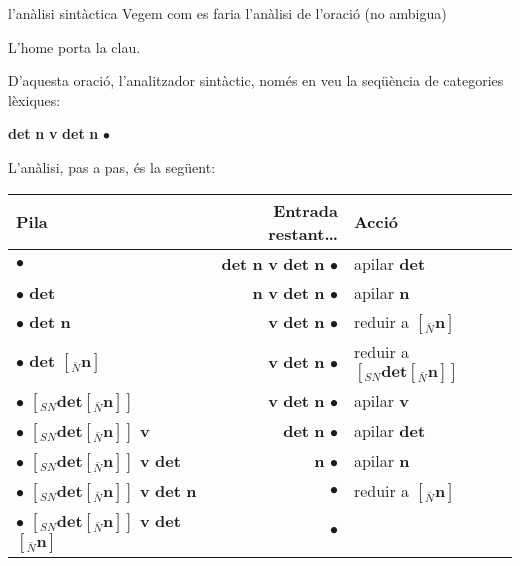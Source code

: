\begin{persabermes}{l'anàlisi sintàctica}
  Vegem com es faria l'anàlisi de l'oració (no ambigua)
  \begin{example}
    L'home porta la clau.
  \end{example}
  D'aquesta oració, l'analitzador sintàctic, només en veu la seqüència
  de categories lèxiques:
  \begin{example}
    \textbf{det} \textbf{n} \textbf{v} \textbf{det} \textbf{n}
    \mbox{$\bullet$}
  \end{example}
  L'anàlisi, pas a pas, és la següent:
  \begin{center}
    \begin{tabular}{l|r|l}
      \hline
      Pila & Entrada restant\ldots & Acció  \\
      \hline
      $\bullet$             
      & 
      \textbf{det} \textbf{n} \textbf{v} \textbf{det} \textbf{n} $\bullet$
      & 
      apilar \textbf{det} 
      \\
      $\bullet$ \textbf{det}
      & 
      \textbf{n} \textbf{v} \textbf{det} \textbf{n} $\bullet$
      & 
      apilar \textbf{n} 
      \\
      $\bullet$ \textbf{det} \textbf{n}
      & 
      \textbf{v} \textbf{det} \textbf{n} $\bullet$
      & 
      reduir a $[_{\bar{N}} \mathbf{n} ]$
      \\
      $\bullet$ \textbf{det} $[_{\bar{N}} \textbf{n} ]$
      & 
      \textbf{v} \textbf{det} \textbf{n} $\bullet$
      & 
      reduir a $[_{SN} \textbf{det} [_{\bar{N}} \mathbf{n} ] ]$
      \\
      $\bullet$ $[_{SN} \textbf{det} [_{\bar{N}} \textbf{n} ] ]$
      & 
      \textbf{v} \textbf{det} \textbf{n} $\bullet$
      & 
      apilar \textbf{v}
      \\
      $\bullet$ $[_{SN} \textbf{det} [_{\bar{N}} \textbf{n} ] ]$ \textbf{v}
      & 
      \textbf{det} \textbf{n} $\bullet$
      & 
      apilar \textbf{det}
      \\
      $\bullet$ $[_{SN} \textbf{det} [_{\bar{N}} \textbf{n} ] ]$
      \textbf{v} \textbf{det}
      & 
      \textbf{n} $\bullet$
      & 
      apilar \textbf{n}
      \\
      $\bullet$ $[_{SN} \textbf{det} [_{\bar{N}} \textbf{n} ] ]$
      \textbf{v} \textbf{det} \textbf{n}
      & 
      $\bullet$
      & 
      reduir a $[_{\bar{N}} \mathbf{n} ]$
      \\
      $\bullet$ $[_{SN} \textbf{det} [_{\bar{N}} \textbf{n} ] ]$
      \textbf{v} \textbf{det} $[_{\bar{N}} \textbf{n} ]$
      & 
      $\bullet$
      & 

\end{tabular}
\end{center}
\end{persabermes}
